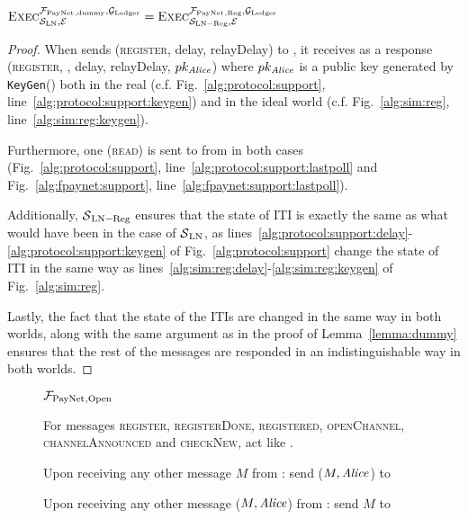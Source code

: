   \begin{lemma}
    \label{lemma:reg}
    $\textsc{Exec}^{\mathcal{F}_{\mathrm{PayNet}}{}_{\mathrm{, dummy}},
    \mathcal{G}_{\mathrm{Ledger}}}_{\mathcal{S}_{\mathrm{LN}}, \mathcal{E}} =
    \textsc{Exec}^{\mathcal{F}_{\mathrm{PayNet}}{}_{\mathrm{, Reg}},
    \mathcal{G}_{\mathrm{Ledger}}}_{\mathcal{S}_{\mathrm{LN - Reg}}, \mathcal{E}}$
  \end{lemma}

  \begin{proof}
    When \environment{} sends (\textsc{register}, delay, relayDelay) to
    \alice{}, it receives as a response (\textsc{register}, \alice, delay,
    relayDelay, $pk_{\mathit{Alice}}$) where $pk_{\mathit{Alice}}$ is a public key generated by
    \texttt{KeyGen}() both in the real (c.f. Fig.~\ref{alg:protocol:support},
    line~\ref{alg:protocol:support:keygen}) and in the ideal world (c.f.
    Fig.~\ref{alg:sim:reg}, line~\ref{alg:sim:reg:keygen}).

    Furthermore, one (\textsc{read}) is sent to \ledger{} from \alice{} in both
    cases (Fig.~\ref{alg:protocol:support},
    line~\ref{alg:protocol:support:lastpoll} and Fig.~\ref{alg:fpaynet:support},
    line~\ref{alg:fpaynet:support:lastpoll}).

    Additionally, $\mathcal{S}{}_{\mathrm{LN - Reg}}$ ensures that the state of
    \alice{} ITI is exactly the same as what would have been in the case of
    $\mathcal{S}{}_{\mathrm{LN}}$, as
    lines~\ref{alg:protocol:support:delay}-\ref{alg:protocol:support:keygen} of
    Fig.~\ref{alg:protocol:support} change the state of \alice{} ITI in the same
    way as lines~\ref{alg:sim:reg:delay}-\ref{alg:sim:reg:keygen} of
    Fig.~\ref{alg:sim:reg}.

    Lastly, the fact that the state of the \alice{} ITIs are changed in the same
    way in both worlds, along with the same argument as in the proof of
    Lemma~\ref{lemma:dummy} ensures that the rest of the messages are responded
    in an indistinguishable way in both worlds.
  \end{proof}

  \begin{figure}[H]
    \begin{systembox}{$\mathcal{F}_{\mathrm{PayNet}}{}_{\mathrm{, Open}}$}
      \begin{algorithmic}[1]
        \State For messages \textsc{register}, \textsc{registerDone},
        \textsc{registered}, \textsc{openChannel}, \textsc{channelAnnounced} and
        \textsc{checkNew}, act like \fpaynet{}.
        \Statex

        \State Upon receiving any other message $M$ from \alice:
        \Indent
            \State send ($M, \mathit{Alice}$) to \simulator
          \EndIf
        \EndIndent
        \Statex

        \State Upon receiving any other message ($M, \mathit{Alice}$) from \simulator:
        \Indent
            \State send $M$ to \alice
          \EndIf
        \EndIndent
      \end{algorithmic}
    \end{systembox}
    \caption{}
    \label{alg:proof:fpaynet:open}
  \end{figure}

